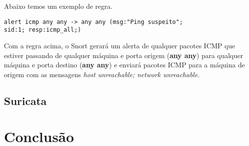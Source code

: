 Abaixo temos um exemplo de regra.

\begin{lstlisting}
alert icmp any any -> any any (msg:"Ping suspeito"; 
sid:1; resp:icmp_all;)
\end{lstlisting}

Com a regra acima, o Snort gerará um alerta de qualquer pacotes ICMP que estiver passando de qualquer máquina e porta origem (\textbf{any any}) para qualquer máquina e porta destino (\textbf{any any}) e enviará pacotes ICMP para a máquina de origem com as mensagens \textit{host unreachable; network unreachable}.

\subsection{Suricata} \label{sec:suricata}
\section{Conclusão} \label{sec:idps-conclusao}
